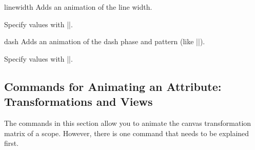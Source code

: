 \begin{sysanimateattribute}{linewidth}
    Adds an animation of the line width.

    Specify values with |\pgfsysanimvaldimension|.
\begin{codeexample}[
    preamble={\usetikzlibrary{animations}},
    animation list={0.5,1,1.5,2},
]
\end{codeexample}
\end{sysanimateattribute}

\begin{sysanimateattribute}{dash}
    Adds an animation of the dash phase and pattern (like |\pgfsys@setdash|).

    Specify values with |\pgfsysanimvaldash|.
\begin{codeexample}[
    preamble={\usetikzlibrary{animations}},
    animation list={0.5,1,1.5,2},
]
\end{codeexample}
\begin{codeexample}[
    preamble={\usetikzlibrary{animations}},
    animation list={0.5,1,1.5,2},
]
\end{codeexample}
\begin{codeexample}[
    preamble={\usetikzlibrary{animations}},
    animation list={0.5,1,1.5,2},
]
\end{codeexample}
\end{sysanimateattribute}


\subsection{Commands for Animating an Attribute: Transformations  and Views}

The commands in this section allow you to animate the canvas transformation
matrix of a scope. However, there is one command that needs to be explained
first.

